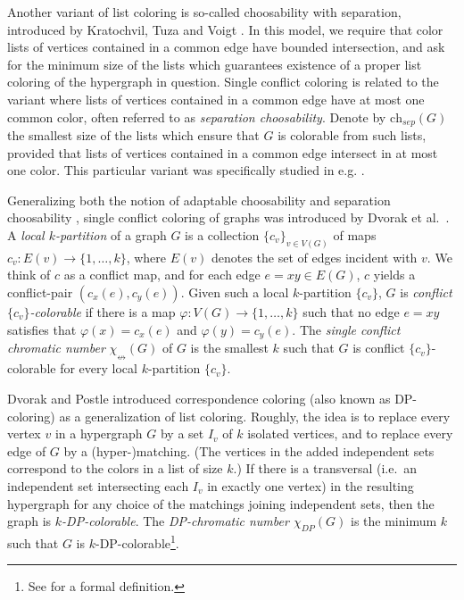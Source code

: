 \documentclass[12pt]{article}
\newcommand{\single}{\chi_{\nleftrightarrow}}
\newcommand{\ch}{\mathrm{ch}}
\newcommand{\1}{\mathds{1}}
\begin{document}
Another variant of list coloring is so-called
choosability with separation, introduced by Kratochvil, Tuza and Voigt
\cite{KratochvilTuzaVoigt}. In this model, we require that color lists of  vertices contained in a common edge
have bounded intersection,
and ask for the minimum size of the lists which guarantees existence of a proper list coloring of the hypergraph in question.
Single conflict coloring is related to the variant where lists of vertices contained in a common edge have
at most one common color, often referred to as  {\em separation choosability}.
Denote by $\ch_{sep}(G)$ the smallest size of the lists which ensure that $G$ is colorable
from such lists, provided that lists of vertices contained in a common edge intersect in at most one color. This
particular variant was specifically studied in e.g. \cite{EsperetKangThomasse, FurediKostochkaKumbhat}.

Generalizing both the notion of adaptable choosability and separation choosability
\cite{KratochvilTuzaVoigt},
single conflict coloring of graphs was introduced by Dvorak et al.\ 
\cite{DvorakEsperetKangOzeki}. 
A {\em local $k$-partition} of a graph $G$ is a collection $\{c_v\}_{v \in V(G)}$ of maps 
	$c_v : E(v) \to \{1,\dots, k\}$, where $E(v)$ denotes the set of edges incident
	with $v$. We think of $c$ as a conflict map, and for each
	edge $e = xy \in E(G)$, $c$ yields a conflict-pair 
	$(c_{x}(e), c_{y}(e))$. Given such a local $k$-partition $\{c_v\}$,
	$G$ is {\em conflict $\{c_v\}$-colorable} if there is a map 
	$\varphi: V(G) \to \{1,\dots, k\}$ such that no edge $e = xy$ 
	satisfies that $\varphi(x) = c_{x}(e)$ and $\varphi(y) = c_{y}(e)$.
	The {\em single conflict chromatic number} $\single(G)$ of
	$G$ is the smallest $k$ such that
	$G$ is conflict $\{c_v\}$-colorable for every local $k$-partition $\{c_v\}$.



	Dvorak and Postle \cite{DvorakPostle} introduced correspondence coloring
	(also known as DP-coloring) as a generalization of list coloring. Roughly, the idea
	is to replace every vertex $v$ in a hypergraph $G$
	by a set $I_v$ of $k$ isolated vertices, and to replace every edge of $G$ by a (hyper-)matching.
	(The vertices in the added independent sets correspond to the colors in a list of size $k$.)
	If there is a transversal (i.e.\ an independent set intersecting each $I_v$ in exactly one vertex)
	in the resulting hypergraph for any choice of the matchings joining
	independent sets, then the graph is 
	{\em $k$-DP-colorable}.
	The {\em DP-chromatic number $\chi_{DP}(G)$} is the minimum $k$ such that
	$G$ is $k$-DP-colorable\footnote{See \cite{Schweser} for a formal definition.}.  
\end{document}
